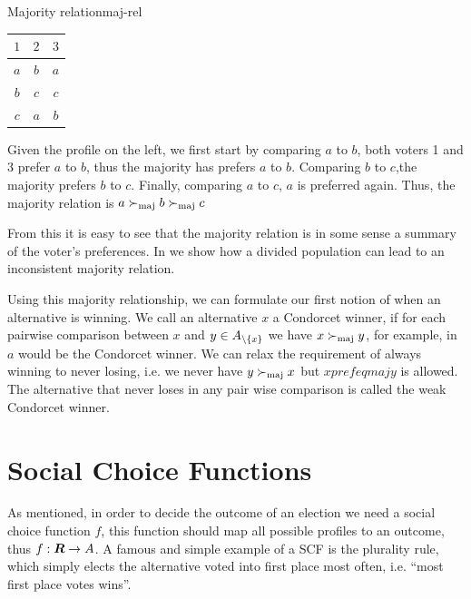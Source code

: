 \begin{example}{Majority relation}{maj-rel}
	\begin{minipage}{0.15\linewidth}
		\begin{tabular}{ccc}
			\toprule
			$1$ & $2$ & $3$ \\
			\midrule
			$a$ & $b$ & $a$ \\
			$b$ & $c$ & $c$ \\
			$c$ & $a$ & $b$ \\
			\bottomrule
		\end{tabular}
	\end{minipage}
	\hspace{0.02\linewidth}
	\begin{minipage}{0.78\linewidth}
		Given the profile on the left, we first start by comparing $a$ to $b$, both voters 1 and 3 prefer $a$ to $b$, thus the majority has prefers $a$ to $b$. Comparing $b$ to $c$,the majority prefers $b$ to $c$. Finally, comparing $a$ to $c$, $a$ is preferred again. Thus, the majority relation is $a \succ_{\textnormal{maj}} b \succ_{\textnormal{maj}} c$
	\end{minipage}
\end{example}

From this it is easy to see that the majority relation is in some sense a
summary of the voter's preferences. In 
we show how a divided population can lead to an inconsistent majority relation.

Using this majority relationship, we can formulate our first notion of when an
alternative is winning. We call an alternative $x$ a Condorcet winner, if for
each pairwise comparison between $x$ and $y \in A_{\setminus
		\{x\}}$ we have $x \succ_{\textnormal{maj}} y$, for example, in  $a$ would be
the Condorcet winner. We can relax the requirement of always winning to never
losing, i.e. we never have $y \succ_{\textnormal{maj}} x$ but $x prefeqmaj y$ is allowed. The
alternative that never loses in any pair wise comparison is called the weak
Condorcet winner.

\section{Social Choice Functions} \label{sec:SCF}

As mentioned, in order to decide the outcome of an election we need a social choice function
$f$, this function should map all possible profiles to an outcome, thus $f:
	\boldsymbol{R} \to A$. A famous and simple example of a SCF is the plurality
rule, which simply elects the alternative voted into first place most often, i.e. ``most first place votes wins''.

